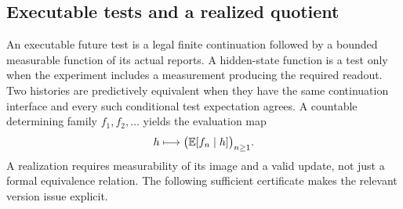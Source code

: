 \subsection{Executable tests and a realized quotient}
An executable future test is a legal finite continuation followed by a bounded measurable function of its actual reports. A hidden-state function is a test only when the experiment includes a measurement producing the required readout. Two histories are predictively equivalent when they have the same continuation interface and every such conditional test expectation agrees. A countable determining family $f_1,f_2,\ldots$ yields the evaluation map
\begin{equation}\label{eq:eval}
 h\longmapsto \big(\mathbb E[f_n\mid h]\big)_{n\ge1}.
\end{equation}
A realization requires measurability of its image and a valid update, not just a formal equivalence relation. The following sufficient certificate makes the relevant version issue explicit.

